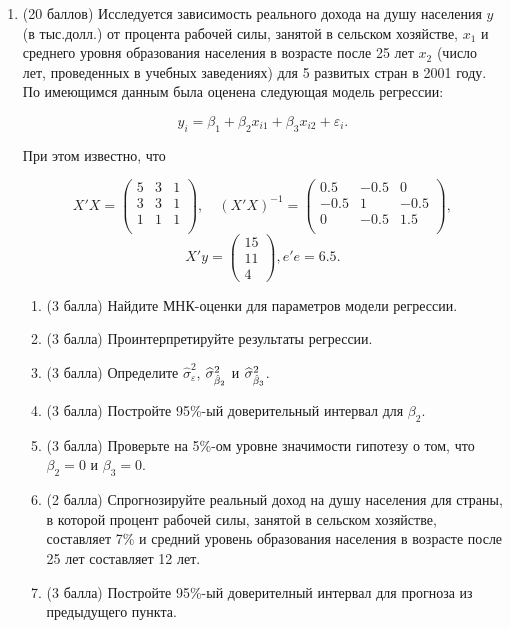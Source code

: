 \begin{enumerate}
\item (20 баллов) Исследуется зависимость реального дохода на душу населения $y$ (в тыс.долл.) от процента рабочей силы, занятой в сельском хозяйстве, $x_1$ и среднего уровня образования населения в возрасте после 25 лет $x_2$ (число лет, проведенных в учебных заведениях) для 5 развитых стран в 2001 году. По имеющимся данным была оценена следующая модель регрессии:

\[
y_i = \beta_1 + \beta_2x_{i1} + \beta_3x_{i2} + \varepsilon_i.
\]

При этом известно, что

\[
X' X =  \begin{pmatrix}
5 & 3 & 1 \\
3 & 3 & 1 \\
1 & 1 & 1 \\
\end{pmatrix}, \quad (X' X)^{-1} =  \begin{pmatrix}
0.5 & -0.5 & 0 \\
-0.5 & 1 & -0.5 \\
0 & -0.5 & 1.5 \\
\end{pmatrix}, 
\]
\[
X'y =\begin{pmatrix}
15 \\
11 \\
4 
\end{pmatrix}, e'e = 6.5.
\]

\begin{enumerate}
\item (3 балла) Найдите МНК-оценки для параметров модели регрессии.
\item (3 балла) Проинтерпретируйте результаты регрессии.
\item (3 балла) Определите $\widehat{\sigma}^2_{\varepsilon}$, $\widehat{\sigma}^2_{\hat{\beta}_2}$ и $\widehat{\sigma}^2_{\hat{\beta}_3}$.
\item (3 балла) Постройте 95\%-ый доверительный интервал для $\beta_2$.
\item (3 балла) Проверьте на 5\%-ом уровне значимости гипотезу о том, что $\beta_2 = 0$ и $\beta_3 = 0$.
\item (2 балла) Спрогнозируйте реальный доход на душу населения для страны, в которой процент рабочей силы, занятой в сельском хозяйстве, составляет 7\% и средний уровень образования населения в возрасте после 25 лет составляет 12 лет.
\item (3 балла) Постройте 95\%-ый доверителный интервал для прогноза из предыдущего пункта.
\end{enumerate}


\end{enumerate}
